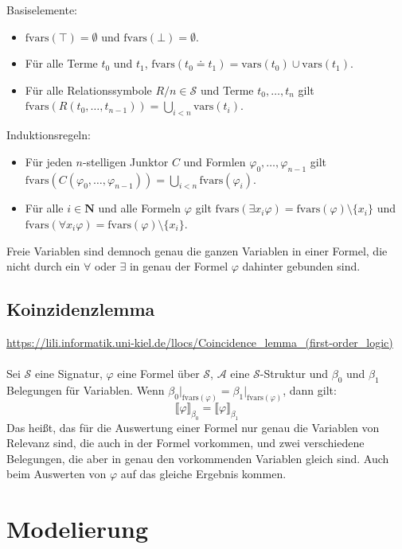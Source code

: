 \documentclass[twocolumn]{article}
\begin{document}
    Basiselemente:
    \begin{itemize}
        \item $\text{fvars}(\top) = \emptyset$ und $\text{fvars}(\bot) = \emptyset$.
        \item Für alle Terme $t_0$ und $t_1$, $\text{fvars}(t_0 \doteq t_1) = \text{vars}(t_0) \cup \text{vars}(t_1)$.
        \item Für alle Relationssymbole $R/n \in \mathcal S$ und Terme $t_0, \dots, t_n$ gilt $\text{fvars}(R(t_0, \dots, t_{n-1})) = \bigcup_{i < n} \text{vars}(t_i)$.
    \end{itemize}
    Induktionsregeln:
    \begin{itemize}
        \item Für jeden $n$-stelligen Junktor $C$ und Formlen $\varphi_0, \dots, \varphi_{n-1}$ gilt $\text{fvars}(C(\varphi_0, \dots, \varphi_{n-1})) = \bigcup_{i < n} \text{fvars}(\varphi_i)$.
        \item Für alle $i \in \mathbf N$ und alle Formeln $\varphi$ gilt $\text{fvars}(\exists x_i \varphi) = \text{fvars}(\varphi) \setminus \{x_i\}$ und $\text{fvars}(\forall x_i \varphi) = \text{fvars}(\varphi) \setminus \{x_i\}$.
    \end{itemize}
    Freie Variablen sind demnoch genau die ganzen Variablen in einer Formel, die nicht durch ein $\forall$ oder $\exists$ in genau der Formel $\varphi$ dahinter gebunden sind.

    \subsection{Koinzidenzlemma}
    \url{https://lili.informatik.uni-kiel.de/llocs/Coincidence_lemma_(first-order_logic)}\\\\
    Sei $\mathcal S$ eine Signatur, $\varphi$ eine Formel über $\mathcal S$, $\mathcal A$ eine $\mathcal S$-Struktur und $\beta_0$ und $\beta_1$ Belegungen für Variablen. Wenn $\beta_0\vert_{\text{fvars}(\varphi)} = \beta_1\vert_{\text{fvars}(\varphi)}$, dann gilt:
    $$ \llbracket\varphi\rrbracket_{\beta_0} = \llbracket\varphi\rrbracket_{\beta_1}$$
    Das heißt, das für die Auswertung einer Formel nur genau die Variablen von Relevanz sind, die auch in der Formel vorkommen, und zwei verschiedene Belegungen, die aber in genau den vorkommenden Variablen gleich sind. Auch beim Auswerten von $\varphi$ auf das gleiche Ergebnis kommen.

    \section{Modelierung}
\end{document}
